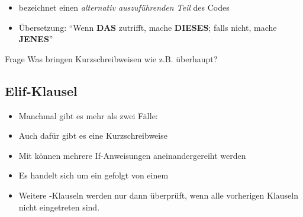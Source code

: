 \begin{frame}
    \slidehead

    \begin{itemize}
        \item {} bezeichnet einen \textit{alternativ auszuführenden Teil} des Codes
        \item Übersetzung: "`Wenn \textbf{DAS} zutrifft, mache \textbf{DIESES}; falls nicht, mache \textbf{JENES}"'
    \end{itemize}

    \begin{block}{Frage}
        Was bringen Kurzschreibweisen wie z.B.  überhaupt?
    \end{block}
\end{frame}

\subsection{Elif-Klausel}

\begin{frame}
    \slidehead
    \begin{itemize}
        \item Manchmal gibt es mehr als zwei Fälle:
        \item Auch dafür gibt es eine Kurzschreibweise
    \end{itemize}
\end{frame}

\begin{frame}
    \slidehead

    \begin{itemize}
        \item Mit  können mehrere If-Anweisungen aneinandergereiht werden
        \item Es handelt sich um ein  gefolgt von einem 
        \item Weitere -Klauseln werden nur dann überprüft, wenn alle vorherigen Klauseln nicht eingetreten sind.
    \end{itemize}
\end{frame}

\livecoding


